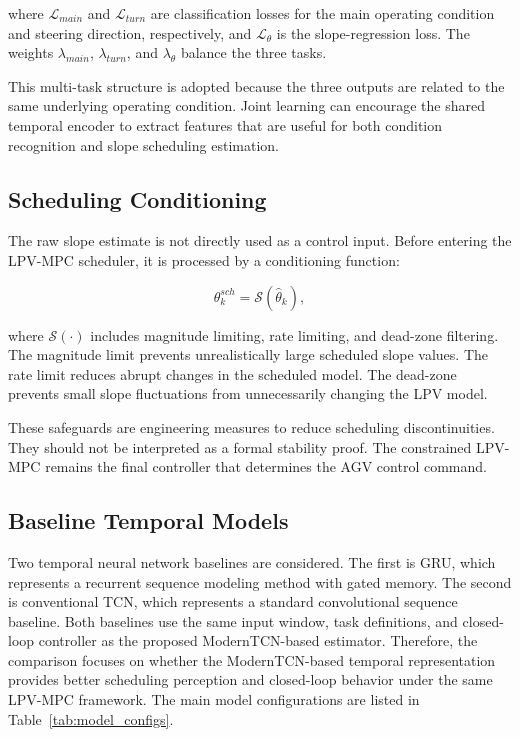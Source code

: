 \documentclass{ieeeaccess}
\begin{document}
where $\mathcal{L}_{main}$ and $\mathcal{L}_{turn}$ are classification losses for the main operating condition and steering direction, respectively, and $\mathcal{L}_{\theta}$ is the slope-regression loss. The weights $\lambda_{main}$, $\lambda_{turn}$, and $\lambda_{\theta}$ balance the three tasks.



This multi-task structure is adopted because the three outputs are related to the same underlying operating condition. Joint learning can encourage the shared temporal encoder to extract features that are useful for both condition recognition and slope scheduling estimation.



\subsection{Scheduling Conditioning}



The raw slope estimate is not directly used as a control input. Before entering the LPV-MPC scheduler, it is processed by a conditioning function:

\begin{equation}
\theta^{sch}_k = \mathcal{S}(\hat{\theta}_k),
\label{eq:scheduling_conditioning}
\end{equation}

where $\mathcal{S}(\cdot)$ includes magnitude limiting, rate limiting, and dead-zone filtering. The magnitude limit prevents unrealistically large scheduled slope values. The rate limit reduces abrupt changes in the scheduled model. The dead-zone prevents small slope fluctuations from unnecessarily changing the LPV model.



These safeguards are engineering measures to reduce scheduling discontinuities. They should not be interpreted as a formal stability proof. The constrained LPV-MPC remains the final controller that determines the AGV control command.



\subsection{Baseline Temporal Models}



Two temporal neural network baselines are considered. The first is GRU, which represents a recurrent sequence modeling method with gated memory. The second is conventional TCN, which represents a standard convolutional sequence baseline. Both baselines use the same input window, task definitions, and closed-loop controller as the proposed ModernTCN-based estimator. Therefore, the comparison focuses on whether the ModernTCN-based temporal representation provides better scheduling perception and closed-loop behavior under the same LPV-MPC framework. The main model configurations are listed in Table~\ref{tab:model_configs}.
\end{document}
